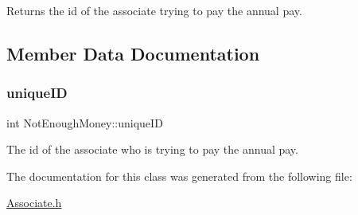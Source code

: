 Returns the id of the associate trying to pay the annual pay. 



\subsection{Member Data Documentation}
\mbox{\label{classNotEnoughMoney_a448ce0cf6fa4322dca36d379c3b94028}} 
\subsubsection{\texorpdfstring{unique\+ID}{uniqueID}}
{\footnotesize\ttfamily int Not\+Enough\+Money\+::unique\+ID\hspace{0.3cm}{\ttfamily [private]}}



The id of the associate who is trying to pay the annual pay. 



The documentation for this class was generated from the following file\+:\begin{DoxyCompactItemize}
\item 
\hyperlink{Associate_8h}{Associate.\+h}\end{DoxyCompactItemize}
